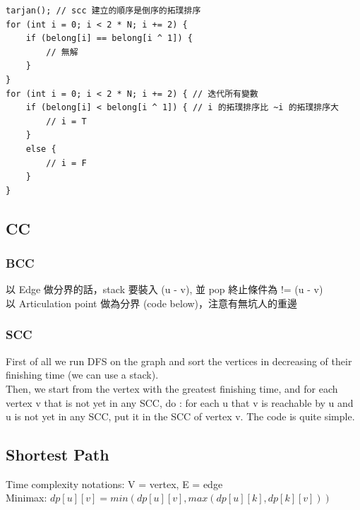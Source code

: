 \documentclass[10pt,oneside]{article}
\begin{document}
\begin{landscape}
\begin{multicols}{2}
\begin{verbatim}
tarjan(); // scc 建立的順序是倒序的拓璞排序
for (int i = 0; i < 2 * N; i += 2) {
    if (belong[i] == belong[i ^ 1]) {
        // 無解
    }
}
for (int i = 0; i < 2 * N; i += 2) { // 迭代所有變數
    if (belong[i] < belong[i ^ 1]) { // i 的拓璞排序比 ~i 的拓璞排序大
        // i = T
    }
    else {
        // i = F
    }
}
\end{verbatim}

\subsection{CC}

\subsubsection{BCC}
以 Edge 做分界的話，stack 要裝入 (u - v), 並 pop 終止條件為 != (u - v) \\
以 Articulation point 做為分界 (code below)，注意有無坑人的重邊

\subsubsection{SCC}

First of all we run DFS on the graph and sort the vertices in decreasing of their finishing time (we can use a stack).\\
Then, we start from the vertex with the greatest finishing time, and for each vertex v that is not yet in any SCC, do : for each u that v is reachable by u and u is not yet in any SCC, put it in the SCC of vertex v. The code is quite simple.


\subsection{Shortest Path}

Time complexity notations: V = vertex, E = edge \\
Minimax: $dp[u][v] = min(dp[u][v], max(dp[u][k], dp[k][v]))$ \\




\end{multicols}
\end{landscape}
\end{document}
